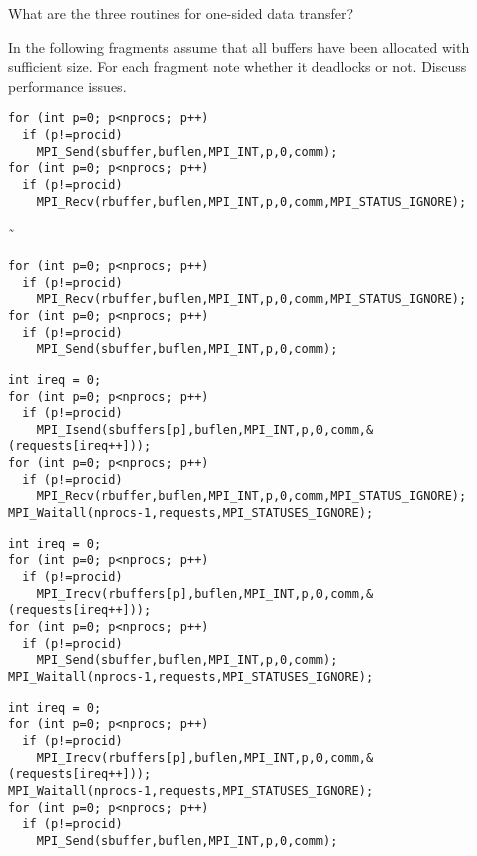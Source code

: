 \begin{review}
  What are the three routines for one-sided data transfer?
\end{review}

\lstset{
  style=reviewcode,
  language=C,
}

\begin{review}
  In the following fragments %
  assume that all buffers have been
  allocated with sufficient size. For each fragment note whether it
  deadlocks or not. Discuss performance issues.
\end{review}

    \lstset{language=C,basicstyle=\footnotesize\ttfamily}
\begin{lstlisting}
for (int p=0; p<nprocs; p++)
  if (p!=procid)
    MPI_Send(sbuffer,buflen,MPI_INT,p,0,comm);
for (int p=0; p<nprocs; p++)
  if (p!=procid)
    MPI_Recv(rbuffer,buflen,MPI_INT,p,0,comm,MPI_STATUS_IGNORE);
\end{lstlisting}
˜    %
\begin{lstlisting}
for (int p=0; p<nprocs; p++)
  if (p!=procid)
    MPI_Recv(rbuffer,buflen,MPI_INT,p,0,comm,MPI_STATUS_IGNORE);
for (int p=0; p<nprocs; p++)
  if (p!=procid)
    MPI_Send(sbuffer,buflen,MPI_INT,p,0,comm);
\end{lstlisting}
\begin{lstlisting}
int ireq = 0;
for (int p=0; p<nprocs; p++)
  if (p!=procid)
    MPI_Isend(sbuffers[p],buflen,MPI_INT,p,0,comm,&(requests[ireq++]));
for (int p=0; p<nprocs; p++)
  if (p!=procid)
    MPI_Recv(rbuffer,buflen,MPI_INT,p,0,comm,MPI_STATUS_IGNORE);
MPI_Waitall(nprocs-1,requests,MPI_STATUSES_IGNORE);
\end{lstlisting}
\begin{lstlisting}
int ireq = 0;
for (int p=0; p<nprocs; p++)
  if (p!=procid)
    MPI_Irecv(rbuffers[p],buflen,MPI_INT,p,0,comm,&(requests[ireq++]));
for (int p=0; p<nprocs; p++)
  if (p!=procid)
    MPI_Send(sbuffer,buflen,MPI_INT,p,0,comm);
MPI_Waitall(nprocs-1,requests,MPI_STATUSES_IGNORE);
\end{lstlisting}
\begin{lstlisting}
int ireq = 0;
for (int p=0; p<nprocs; p++)
  if (p!=procid)
    MPI_Irecv(rbuffers[p],buflen,MPI_INT,p,0,comm,&(requests[ireq++]));
MPI_Waitall(nprocs-1,requests,MPI_STATUSES_IGNORE);
for (int p=0; p<nprocs; p++)
  if (p!=procid)
    MPI_Send(sbuffer,buflen,MPI_INT,p,0,comm);
\end{lstlisting}

